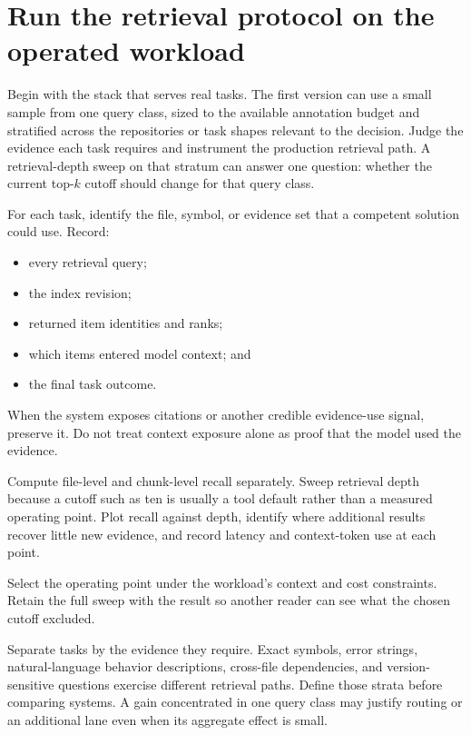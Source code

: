 \hypertarget{run-the-retrieval-protocol-on-the-operated-workload}{%
\section{Run the retrieval protocol on the operated workload}\label{run-the-retrieval-protocol-on-the-operated-workload}}

Begin with the stack that serves real tasks. The first version can use a small sample from one query class, sized to the available annotation budget and stratified across the repositories or task shapes relevant to the decision. Judge the evidence each task requires and instrument the production retrieval path. A retrieval-depth sweep on that stratum can answer one question: whether the current top-\(k\) cutoff should change for that query class.


For each task, identify the file, symbol, or evidence set that a competent solution could use. Record:

\begin{itemize}
\tightlist
\item
  every retrieval query;
\item
  the index revision;
\item
  returned item identities and ranks;
\item
  which items entered model context; and
\item
  the final task outcome.
\end{itemize}

When the system exposes citations or another credible evidence-use signal, preserve it. Do not treat context exposure alone as proof that the model used the evidence.

Compute file-level and chunk-level recall separately. Sweep retrieval depth because a cutoff such as ten is usually a tool default rather than a measured operating point. Plot recall against depth, identify where additional results recover little new evidence, and record latency and context-token use at each point.

Select the operating point under the workload's context and cost constraints. Retain the full sweep with the result so another reader can see what the chosen cutoff excluded.

Separate tasks by the evidence they require. Exact symbols, error strings, natural-language behavior descriptions, cross-file dependencies, and version-sensitive questions exercise different retrieval paths. Define those strata before comparing systems. A gain concentrated in one query class may justify routing or an additional lane even when its aggregate effect is small.

